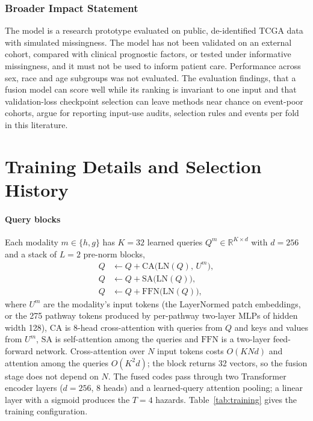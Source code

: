 \documentclass{article}
\begin{document}
\subsubsection*{Broader Impact Statement}
The model is a research prototype evaluated on public, de-identified TCGA data with simulated missingness. The model has not been validated on an external cohort, compared with clinical prognostic factors, or tested under informative missingness, and it must not be used to inform patient care. Performance across sex, race and age subgroups was not evaluated. The evaluation findings, that a fusion model can score well while its ranking is invariant to one input and that validation-loss checkpoint selection can leave methods near chance on event-poor cohorts, argue for reporting input-use audits, selection rules and events per fold in this literature.




\appendix

\section{Training Details and Selection History}
\label{app:training}

\paragraph{Query blocks} Each modality $m \in \{h, g\}$ has $K = 32$ learned queries $Q^m \in \mathbb{R}^{K \times d}$ with $d = 256$ and a stack of $L = 2$ pre-norm blocks,
\begin{align}
Q &\leftarrow Q + \mathrm{CA}\big(\mathrm{LN}(Q),\, U^m\big), \\
Q &\leftarrow Q + \mathrm{SA}\big(\mathrm{LN}(Q)\big), \\
Q &\leftarrow Q + \mathrm{FFN}\big(\mathrm{LN}(Q)\big),
\end{align}
where $U^m$ are the modality's input tokens (the LayerNormed patch embeddings, or the 275 pathway tokens produced by per-pathway two-layer MLPs of hidden width 128), $\mathrm{CA}$ is 8-head cross-attention with queries from $Q$ and keys and values from $U^m$, $\mathrm{SA}$ is self-attention among the queries and $\mathrm{FFN}$ is a two-layer feed-forward network. Cross-attention over $N$ input tokens costs $O(KNd)$ and attention among the queries $O(K^2 d)$; the block returns 32 vectors, so the fusion stage does not depend on $N$. The fused codes pass through two Transformer encoder layers ($d = 256$, 8 heads) and a learned-query attention pooling; a linear layer with a sigmoid produces the $T = 4$ hazards. Table~\ref{tab:training} gives the training configuration.
\end{document}
